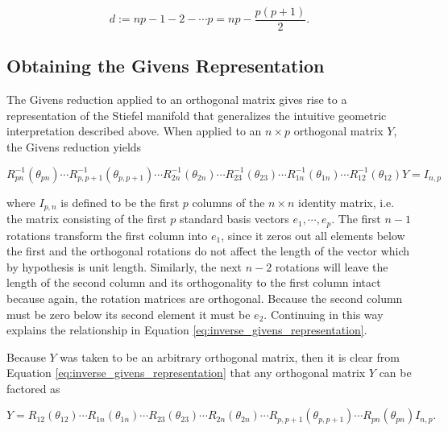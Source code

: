\documentclass[ba]{imsart}
\numberwithin{equation}{section}
\theoremstyle{plain}
\begin{document}
\begin{equation}
\label{eq:stiefel_dimension}
d := np - 1 - 2- \cdots p  = np - \frac{p(p+1)}{2}.
\end{equation}

\subsection{Obtaining the Givens Representation}
The Givens reduction applied to an orthogonal matrix gives rise to a representation of the Stiefel manifold that generalizes the intuitive geometric interpretation described above. When applied to an $n \times p$ orthogonal matrix $Y$, the Givens reduction yields 

\begin{equation}
\label{eq:inverse_givens_representation}
R_{pn}^{-1}(\theta_{pn}) \cdots R_{p,p+1}^{-1}(\theta_{p,p+1})  \cdots R_{2n}^{-1}(\theta_{2n}) \cdots R_{23}^{-1}(\theta_{23}) \cdots R_{1n}^{-1}(\theta_{1n}) \cdots R_{12}^{-1}(\theta_{12}) Y = I_{n,p}
\end{equation}

\noindent where $I_{p,n}$ is defined to be the first $p$ columns of the $n \times n$ identity matrix, i.e. the matrix consisting of the first $p$ standard basis vectors $e_1, \cdots, e_p$. The first $n-1$ rotations transform the first column into $e_1$, since it zeros out all elements below the first and the orthogonal rotations do not affect the length of the vector which by hypothesis is unit length. Similarly, the next $n-2$ rotations will leave the length of the second column and its orthogonality to the first column intact because again, the rotation matrices are orthogonal. Because the second column must be zero below its second element it must be $e_2$. Continuing in this way explains the relationship in Equation \ref{eq:inverse_givens_representation}.

\noindent Because $Y$ was taken to be an arbitrary orthogonal matrix, then it is clear from Equation \ref{eq:inverse_givens_representation} that any orthogonal matrix $Y$ can be factored as

\begin{equation}
\label{eq:givens_representation}
Y = R_{12}(\theta_{12}) \cdots R_{1n}(\theta_{1n})  \cdots R_{23}(\theta_{23}) \cdots R_{2n}(\theta_{2n}) \cdots R_{p,p+1}(\theta_{p,p+1}) \cdots R_{pn}(\theta_{pn}) I_{n,p}.
\end{equation}
\end{document}
